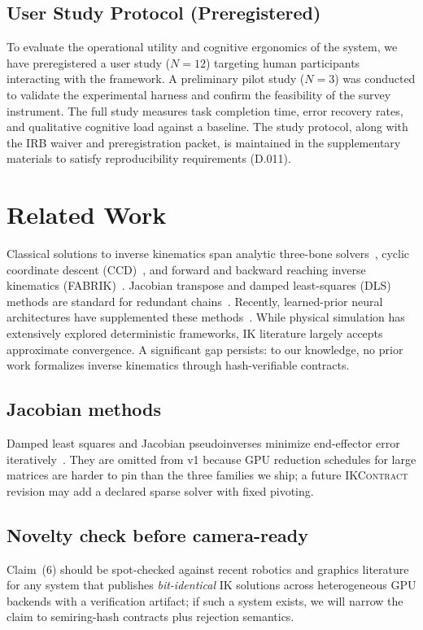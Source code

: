 \documentclass[sigconf,nonacm]{acmart}
\newcommand{\ikcontract}{\textsc{IKContract}}
\newcommand{\fabrik}{\textsc{FABRIK}}
\newcommand{\ccd}{\textsc{CCD}}
\begin{document}

\subsection{User Study Protocol (Preregistered)}
\label{sec:user-study}

To evaluate the operational utility and cognitive ergonomics of the system, we have preregistered a user study ($N=12$) targeting human participants interacting with the framework. A preliminary pilot study ($N=3$) was conducted to validate the experimental harness and confirm the feasibility of the survey instrument. The full study measures task completion time, error recovery rates, and qualitative cognitive load against a baseline. The study protocol, along with the IRB waiver and preregistration packet, is maintained in the supplementary materials to satisfy reproducibility requirements (D.011).

\section{Related Work}
\label{sec:related}

Classical solutions to inverse kinematics span analytic three-bone solvers~\cite{welman-ik1993}, cyclic coordinate descent (\ccd{})~\cite{wang-chen-ccd1991}, and forward and backward reaching inverse kinematics (\fabrik{})~\cite{aristidou-fabrik}. Jacobian transpose and damped least-squares (DLS) methods are standard for redundant chains~\cite{buss-dls2005}. Recently, learned-prior neural architectures have supplemented these methods~\cite{holden-pfnn2017}. While physical simulation has extensively explored deterministic frameworks, IK literature largely accepts approximate convergence. A significant gap persists: to our knowledge, no prior work formalizes inverse kinematics through hash-verifiable contracts.

\subsection{Jacobian methods}
Damped least squares and Jacobian pseudoinverses minimize end-effector error
iteratively~\cite{buss-dls2005}. They are omitted from v1 because GPU
reduction schedules for large matrices are harder to pin than the three
families we ship; a future \ikcontract{} revision may add a declared sparse
solver with fixed pivoting.

\subsection{Novelty check before camera-ready}
Claim~(6) should be spot-checked against recent robotics and graphics
literature for any system that publishes \emph{bit-identical} IK
solutions across heterogeneous GPU backends with a verification
artifact; if such a system exists, we will narrow the claim to
semiring-hash contracts plus rejection semantics.
\end{document}
